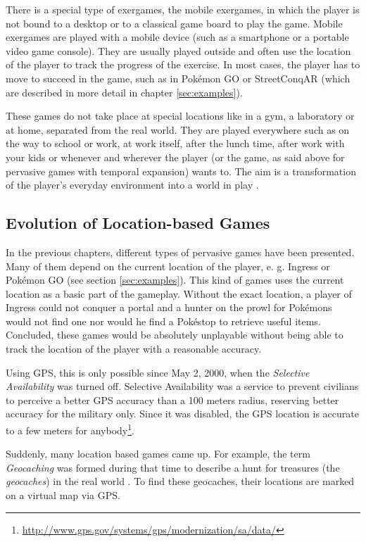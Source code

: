 There is a special type of exergames, the mobile exergames, in which the player is not bound to a desktop or to a classical game board to play the game. Mobile exergames are played with a mobile device (such as a smartphone or a portable video game console). They are usually played outside and often use the location of the player to track the progress of the exercise. In most cases, the player has to move to succeed in the game, such as in Pok\'{e}mon GO or StreetConqAR (which are described in more detail in chapter \ref{sec:examples}).

These games do not take place at special locations like in a gym, a laboratory or at home, separated from the real world. They are played everywhere such as on the way to school or work, at work itself, after the lunch time, after work with your kids or whenever and wherever the player (or the game, as said above for pervasive games with temporal expansion) wants to. The aim is a transformation of the player's everyday environment into a world in play \citep{nieuwdorp2009pervasive}.


\subsection{Evolution of Location-based Games}\label{sec:locationBasedGames}
In the previous chapters, different types of pervasive games have been presented. Many of them depend on the current location of the player, e. g. Ingress or Pok\'{e}mon GO (see section \ref{sec:examples}). This kind of games uses the current location as a basic part of the gameplay. Without the exact location, a player of Ingress could not conquer a portal and a hunter on the prowl for Pok\'{e}mons would not find one nor would he find a Pok\'{e}stop to retrieve useful items. Concluded, these games would be absolutely unplayable without being able to track the location of the player with a reasonable accuracy.

Using GPS, this is only possible since May 2, 2000, when the \emph{Selective Availability} was turned off. Selective Availability was a service to prevent civilians to perceive a better GPS accuracy than a 100 meters radius, reserving better accuracy for the military only. Since it was disabled, the GPS location is accurate to a few meters for anybody\footnote{\url{http://www.gps.gov/systems/gps/modernization/sa/data/}}.

Suddenly, many location based games came up. For example, the term \emph{Geocaching} was formed during that time to describe a hunt for treasures (the \emph{geocaches}) in the real world \citep{Geocaching}. To find these geocaches, their locations are marked on a virtual map via GPS.

